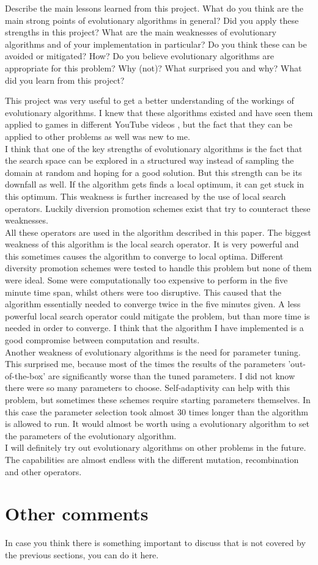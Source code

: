 \documentclass[a4paper,10pt]{article}
\newcommand{\ReplaceMe}[1]{{\color{blue}#1}}
\begin{document}
\ReplaceMe{Describe the main lessons learned from this project. What do you think are the main strong points of evolutionary algorithms in general? Did you apply these strengths in this project? What are the main weaknesses of evolutionary algorithms and of your implementation in particular? Do you think these can be avoided or mitigated? How? Do you believe evolutionary algorithms are appropriate for this problem? Why (not)? What surprised you and why? What did you learn from this project?}

This project was very useful to get a better understanding of the workings of evolutionary algorithms. I knew that these algorithms existed and have seen them applied to games in different YouTube videos \cite{video1, video2}, but the fact that they can be applied to other problems as well was new to me. \\
I think that one of the key strengths of evolutionary algorithms is the fact that the search space can be explored in a structured way instead of sampling the domain at random and hoping for a good solution. But this strength can be its downfall as well. If the algorithm gets finds a local optimum, it can get stuck in this optimum. This weakness is further increased by the use of local search operators. Luckily diversion promotion schemes exist that try to counteract these weaknesses.\\
All these operators are used in the algorithm described in this paper. The biggest weakness of this algorithm is the local search operator. It is very powerful and this sometimes causes the algorithm to converge to local optima. Different diversity promotion schemes were tested to handle this problem but none of them were ideal. Some were computationally too expensive to perform in the five minute time span, whilst others were too disruptive. This caused that the algorithm essentially needed to converge twice in the five minutes given. A less powerful local search operator could mitigate the problem, but than more time is needed in order to converge. I think that the algorithm I have implemented is a good compromise between computation and results.\\
Another weakness of evolutionary algorithms is the need for parameter tuning.  This surprised me, because most of the times the results of the parameters 'out-of-the-box' are significantly worse than the tuned parameters. I did not know there were so many parameters to choose. Self-adaptivity can help with this problem, but sometimes these schemes require starting parameters themselves. In this case the parameter selection took almost 30 times longer than the algorithm is allowed to run. It would almost be worth using a evolutionary algorithm to set the parameters of the evolutionary algorithm.\\
I will definitely try out evolutionary algorithms on other problems in the future. The capabilities are almost endless with the different mutation, recombination and other operators. 

\section{Other comments} \label{sec_other}

\ReplaceMe{In case you think there is something important to discuss that is not covered by the previous sections, you can do it here. }



\end{document}
